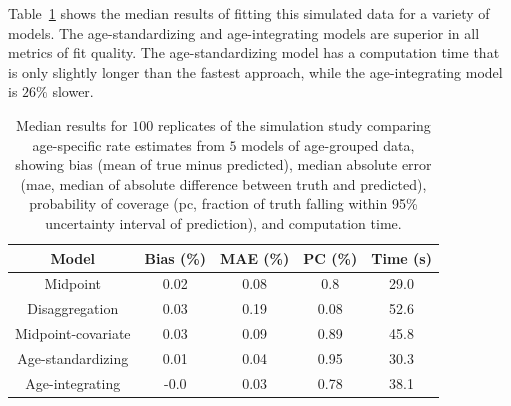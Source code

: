 Table~\ref{age_group_comparison} shows the median results of fitting this simulated data for a variety of models. The age-standardizing and age-integrating models are
superior in all metrics of fit quality.  The age-standardizing
model has a computation time that is only slightly longer than the fastest approach,
while the age-integrating model is $26\%$ slower.

\begin{table}

\begin{center}
\begin{tabular}{|c|c|c|c|c|}
\hline
Model&Bias (\%)&MAE (\%)&PC (\%)&Time (s)\\
\hline
Midpoint&0.02&0.08&0.8&29.0\\
Disaggregation&0.03&0.19&0.08&52.6\\
Midpoint-covariate&0.03&0.09&0.89&45.8\\
Age-standardizing&0.01&0.04&0.95&30.3\\
Age-integrating&-0.0&0.03&0.78&38.1\\
\hline
\end{tabular}
\end{center}

\caption{Median results for $100$ replicates of the simulation study
  comparing age-specific rate estimates from $5$ models of age-grouped
  data, showing bias (mean of true minus predicted), median absolute
  error (mae, median of absolute difference between truth and
  predicted), probability of coverage (pc, fraction of truth falling
  within 95\% uncertainty interval of prediction), and computation time. }
\label{age_group_comparison}
\end{table}
